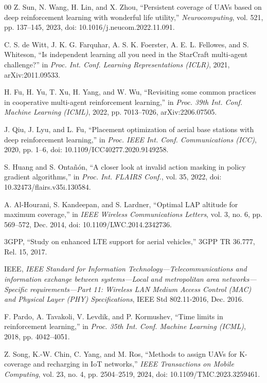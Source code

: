\documentclass[conference]{IEEEtran}
\begin{document}
\begin{thebibliography}{00}
Z. Sun, N. Wang, H. Lin, and X. Zhou, ``Persistent coverage of UAVs based on deep reinforcement learning with wonderful life utility,'' \emph{Neurocomputing}, vol. 521, pp. 137--145, 2023, doi: 10.1016/j.neucom.2022.11.091.

C. S. de Witt, J. K. G. Farquhar, A. S. K. Foerster, A. E. L. Fellowes, and S. Whiteson, ``Is independent learning all you need in the StarCraft multi-agent challenge?'' in \emph{Proc. Int. Conf. Learning Representations (ICLR)}, 2021, arXiv:2011.09533.

H. Fu, H. Yu, T. Xu, H. Yang, and W. Wu, ``Revisiting some common practices in cooperative multi-agent reinforcement learning,'' in \emph{Proc. 39th Int. Conf. Machine Learning (ICML)}, 2022, pp. 7013--7026, arXiv:2206.07505.

J. Qiu, J. Lyu, and L. Fu, ``Placement optimization of aerial base stations with deep reinforcement learning,'' in \emph{Proc. IEEE Int. Conf. Communications (ICC)}, 2020, pp. 1--6, doi: 10.1109/ICC40277.2020.9149258.

S. Huang and S. Onta\~n\'on, ``A closer look at invalid action masking in policy gradient algorithms,'' in \emph{Proc. Int. FLAIRS Conf.}, vol. 35, 2022, doi: 10.32473/flairs.v35i.130584.

A. Al-Hourani, S. Kandeepan, and S. Lardner, ``Optimal LAP altitude for maximum coverage,'' in \emph{IEEE Wireless Communications Letters}, vol. 3, no. 6, pp. 569--572, Dec. 2014, doi: 10.1109/LWC.2014.2342736.

3GPP, ``Study on enhanced LTE support for aerial vehicles,'' 3GPP TR 36.777, Rel. 15, 2017.

IEEE, \emph{IEEE Standard for Information Technology---Telecommunications and information exchange between systems---Local and metropolitan area networks---Specific requirements---Part 11: Wireless LAN Medium Access Control (MAC) and Physical Layer (PHY) Specifications}, IEEE Std 802.11-2016, Dec. 2016.

F. Pardo, A. Tavakoli, V. Levdik, and P. Kormushev, ``Time limits in reinforcement learning,'' in \emph{Proc. 35th Int. Conf. Machine Learning (ICML)}, 2018, pp. 4042--4051.

Z. Song, K.-W. Chin, C. Yang, and M. Ros, ``Methods to assign UAVs for K-coverage and recharging in IoT networks,'' \emph{IEEE Transactions on Mobile Computing}, vol. 23, no. 4, pp. 2504--2519, 2024, doi: 10.1109/TMC.2023.3259461.


\end{thebibliography}
\end{document}
